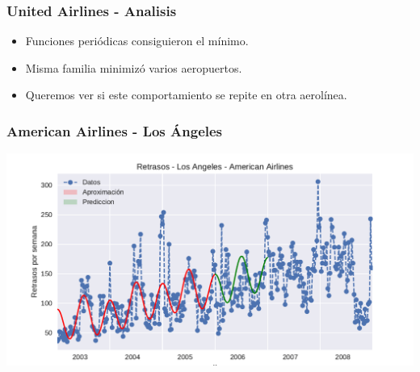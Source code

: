 \documentclass{beamer}
\begin{document}

\begin{frame}


\frametitle{United Airlines - Analisis}

\begin{itemize}

\item{Funciones periódicas consiguieron el mínimo.}
\item{Misma familia minimizó varios aeropuertos.}
\item{Queremos ver si este comportamiento se repite en otra aerolínea.}

\end{itemize}

\end{frame}


\begin{frame}


\frametitle{American Airlines - Los Ángeles}

{\centering
  \includegraphics[width=1.0\linewidth]{diapos/imagenes/retrasosAmericanAirlinesLAvol3.pdf}
}

\end{frame}

\end{document}
